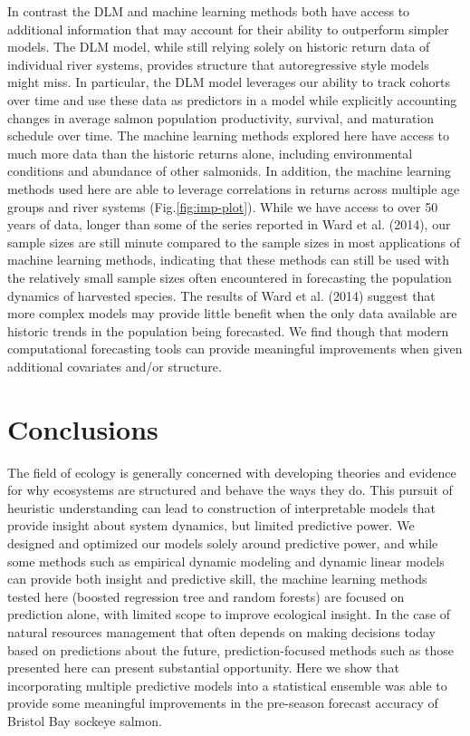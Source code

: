 \documentclass[
]{article}
\begin{document}
In contrast the DLM and machine learning methods both have access to additional information that may account for their ability to outperform simpler models. The DLM model, while still relying solely on historic return data of individual river systems, provides structure that autoregressive style models might miss. In particular, the DLM model leverages our ability to track cohorts over time and use these data as predictors in a model while explicitly accounting changes in average salmon population productivity, survival, and maturation schedule over time. The machine learning methods explored here have access to much more data than the historic returns alone, including environmental conditions and abundance of other salmonids. In addition, the machine learning methods used here are able to leverage correlations in returns across multiple age groups and river systems (Fig.\ref{fig:imp-plot}). While we have access to over 50 years of data, longer than some of the series reported in Ward et al. (2014), our sample sizes are still minute compared to the sample sizes in most applications of machine learning methods, indicating that these methods can still be used with the relatively small sample sizes often encountered in forecasting the population dynamics of harvested species. The results of Ward et al. (2014) suggest that more complex models may provide little benefit when the only data available are historic trends in the population being forecasted. We find though that modern computational forecasting tools can provide meaningful improvements when given additional covariates and/or structure.

\hypertarget{conclusions}{%
\section*{Conclusions}\label{conclusions}}

The field of ecology is generally concerned with developing theories and evidence for why ecosystems are structured and behave the ways they do. This pursuit of heuristic understanding can lead to construction of interpretable models that provide insight about system dynamics, but limited predictive power. We designed and optimized our models solely around predictive power, and while some methods such as empirical dynamic modeling and dynamic linear models can provide both insight and predictive skill, the machine learning methods tested here (boosted regression tree and random forests) are focused on prediction alone, with limited scope to improve ecological insight. In the case of natural resources management that often depends on making decisions today based on predictions about the future, prediction-focused methods such as those presented here can present substantial opportunity. Here we show that incorporating multiple predictive models into a statistical ensemble was able to provide some meaningful improvements in the pre-season forecast accuracy of Bristol Bay sockeye salmon.
\end{document}
